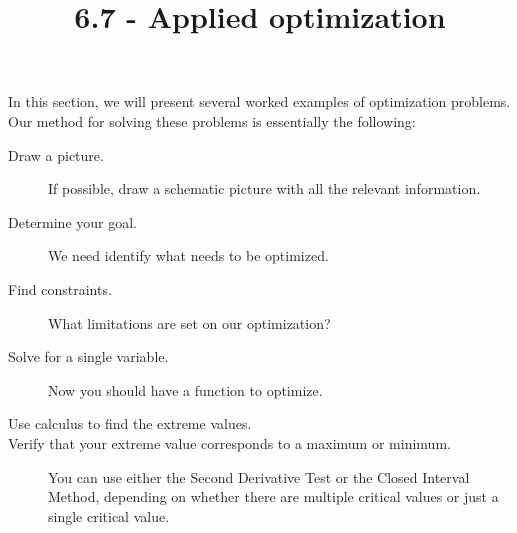 \documentclass{ximera}
\title{6.7 - Applied optimization}
\begin{document}
\begin{abstract}
\end{abstract}
\maketitle


In this section, we will present several worked examples of
optimization problems. Our method for solving these problems is
essentially the following:
\begin{description}
\item[Draw a picture.] If possible, draw a schematic picture with all the relevant information. 
\item[Determine your goal.] We need identify what needs to be
  optimized.
\item[Find constraints.] What limitations are set on our
  optimization?
\item[Solve for a single variable.] Now you should have a function to optimize.
\item[Use calculus to find the extreme values.] 
\item[Verify that your extreme value corresponds to a maximum or minimum.] You can use either the Second Derivative Test or the Closed Interval Method, depending on whether there are multiple critical values or just a single critical value.
\end{description}
\end{document}
